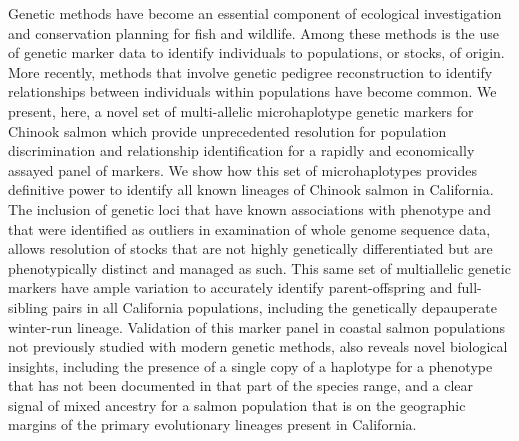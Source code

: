 

Genetic methods have become an essential component of ecological investigation
and conservation planning for fish and wildlife. Among these methods is the use
of genetic marker data to identify individuals to
populations, or stocks, of origin. More recently, methods that involve genetic
pedigree reconstruction to identify relationships between individuals within populations
have become common. We present, here, a novel set of
multi-allelic microhaplotype genetic markers for Chinook salmon which provide unprecedented
resolution for population discrimination and relationship identification for a rapidly and
economically assayed panel of markers. We show how this set of microhaplotypes
provides definitive power to identify all known lineages of Chinook salmon in
California. The inclusion of genetic loci that have known associations with phenotype
and that were identified as outliers in examination of whole genome sequence data,
allows resolution of stocks that are not highly genetically differentiated but
are phenotypically distinct and managed as such. 
This same set of multiallelic genetic markers have ample variation to
accurately identify parent-offspring and full-sibling
pairs in all California populations, including the genetically depauperate winter-run
lineage.
Validation of this marker panel in coastal salmon populations not previously studied with
modern genetic methods, also reveals novel biological insights, including
the presence of a single copy of a haplotype for a phenotype that has not
been documented in that part of the species range, and a clear signal of mixed
ancestry for a salmon population that is on the geographic margins of the 
primary evolutionary lineages present in California.
